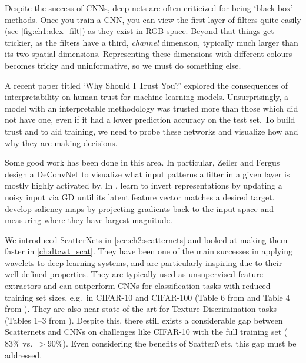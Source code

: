 Despite the success of CNNs, deep nets are often criticized for being `black box'
methods. Once you train a CNN, you can view the first layer of filters
quite easily (see \autoref{fig:ch1:alex_filt}) as they exist in RGB
space. Beyond that things get trickier, as the filters have a third, \emph{channel}
dimension, typically much larger than its two spatial dimensions.
Representing these dimensions with different colours becomes tricky and
uninformative, so we must do something else.

A recent paper titled `Why Should I Trust You?' \cite{ribeiro_why_2016}
explored the consequences of interpretability on human trust for machine learning models.
Unsurprisingly, a model with an interpretable methodology
was trusted more than those which did not have one, even if it had a lower
prediction accuracy on the test set.
To build trust and to aid training, we need to probe these networks and
visualize how and why they are making decisions.

Some good work has been done in this area. In particular,
Zeiler and Fergus \cite{zeiler_visualizing_2014}
design a DeConvNet to visualize what input patterns a filter in a given layer is mostly highly
activated by. In \cite{mahendran_understanding_2015},
\citeauthor{mahendran_understanding_2015} learn to invert
representations by updating a noisy input via GD until its latent feature vector
matches a desired target. \citeauthor{simonyan_deep_2014}
\cite{simonyan_deep_2014} develop saliency maps by projecting gradients back to
the input space and measuring where they have largest magnitude.

We introduced ScatterNets in \autoref{sec:ch2:scatternets} and looked at making
them faster in \autoref{ch:dtcwt_scat}.
They have been one of the main successes in applying wavelets to deep learning
systems, and are particularly inspiring due to their well-defined properties.
They are typically used as unsupervised feature extractors
\cite{bruna_invariant_2013, oyallon_deep_2015,
singh_dual-tree_2017, singh_multi-resolution_2016} and
can outperform CNNs for classification tasks with reduced
training set sizes, e.g.\ in CIFAR-10 and CIFAR-100 (Table 6 from
\cite{oyallon_scaling_2017} and Table 4 from \cite{singh_dual-tree_2017}).
They are also near state-of-the-art for Texture Discrimination tasks
(Tables 1--3 from \cite{sifre_rotation_2013}). Despite this, there still exists
a considerable gap between Scatternets and CNNs on challenges like CIFAR-10 with the
full training set ($83\%$ vs.\ $>90\%$). Even considering the benefits of
ScatterNets, this gap must be addressed.


